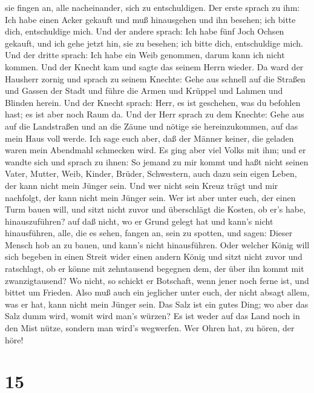 sie fingen an, alle nacheinander, sich zu entschuldigen. Der erste
sprach zu ihm: Ich habe einen Acker gekauft und muß hinausgehen und ihn
besehen; ich bitte dich, entschuldige mich.  Und der andere
sprach: Ich habe fünf Joch Ochsen gekauft, und ich gehe jetzt hin, sie
zu besehen; ich bitte dich, entschuldige mich.  Und der
dritte sprach: Ich habe ein Weib genommen, darum kann ich nicht kommen.
 Und der Knecht kam und sagte das seinem Herrn wieder. Da
ward der Hausherr zornig und sprach zu seinem Knechte: Gehe aus schnell
auf die Straßen und Gassen der Stadt und führe die Armen und Krüppel und
Lahmen und Blinden herein.  Und der Knecht sprach: Herr, es
ist geschehen, was du befohlen hast; es ist aber noch Raum da.
 Und der Herr sprach zu dem Knechte: Gehe aus auf die
Landstraßen und an die Zäune und nötige sie hereinzukommen, auf das mein
Haus voll werde.  Ich sage euch aber, daß der Männer
keiner, die geladen waren mein Abendmahl schmecken wird. 
Es ging aber viel Volks mit ihm; und er wandte sich und sprach zu ihnen:
 So jemand zu mir kommt und haßt nicht seinen Vater,
Mutter, Weib, Kinder, Brüder, Schwestern, auch dazu sein eigen Leben,
der kann nicht mein Jünger sein.  Und wer nicht sein Kreuz
trägt und mir nachfolgt, der kann nicht mein Jünger sein. 
Wer ist aber unter euch, der einen Turm bauen will, und sitzt nicht
zuvor und überschlägt die Kosten, ob er's habe, hinauszuführen?
 auf daß nicht, wo er Grund gelegt hat und kann's nicht
hinausführen, alle, die es sehen, fangen an, sein zu spotten,
 und sagen: Dieser Mensch hob an zu bauen, und kann's nicht
hinausführen.  Oder welcher König will sich begeben in
einen Streit wider einen andern König und sitzt nicht zuvor und
ratschlagt, ob er könne mit zehntausend begegnen dem, der über ihn kommt
mit zwanzigtausend?  Wo nicht, so schickt er Botschaft,
wenn jener noch ferne ist, und bittet um Frieden.  Also muß
auch ein jeglicher unter euch, der nicht absagt allem, was er hat, kann
nicht mein Jünger sein.  Das Salz ist ein gutes Ding; wo
aber das Salz dumm wird, womit wird man's würzen?  Es ist
weder auf das Land noch in den Mist nütze, sondern man wird's wegwerfen.
Wer Ohren hat, zu hören, der höre!

\hypertarget{section-14}{%
\section{15}\label{section-14}}

